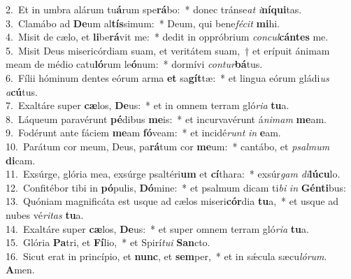 {2.~}Et in umbra alárum tu\textbf{á}rum spe\textbf{rá}bo:~* donec tránse\textit{at} \textit{i}\textbf{ní}\textbf{qui}tas.\\
{3.~}Clamábo ad \textbf{De}um al\textbf{tís}simum:~* Deum, qui bene\textit{fé}\textit{cit} \textbf{mi}hi.\\
{4.~}Misit de cælo, et \textbf{li}be\textbf{rá}vit me:~* dedit in oppróbrium \textit{con}\textit{cul}\textbf{cán}\textbf{tes} me.\\
{5.~}Misit Deus misericórdiam suam, et veritátem suam,~† et erípuit ánimam meam de médio catu\textbf{ló}rum le\textbf{ó}num:~* dormívi \textit{con}\textit{tur}\textbf{bá}tus.\\
{6.~}Fílii hóminum dentes eórum arma \textbf{et} sa\textbf{gít}tæ:~* et lingua eórum gládi\textit{us} \textit{a}\textbf{cú}tus.\\
{7.~}Exaltáre super \textbf{cæ}los, \textbf{De}us:~* et in omnem terram gló\textit{ri}\textit{a} \textbf{tu}a.\\
{8.~}Láqueum paravérunt \textbf{pé}dibus \textbf{me}is:~* et incurvavérunt á\textit{ni}\textit{mam} \textbf{me}am.\\
{9.~}Fodérunt ante fáciem \textbf{me}am \textbf{fó}veam:~* et incidé\textit{runt} \textit{in} \textbf{e}am.\\
{10.~}Parátum cor meum, Deus, pa\textbf{rá}tum cor \textbf{me}um:~* cantábo, et \textit{psal}\textit{mum} \textbf{di}cam.\\
{11.~}Exsúrge, glória mea, exsúrge psaltéri\textbf{um} et \textbf{cí}thara:~* exsúr\textit{gam} \textit{di}\textbf{lú}\textbf{cu}lo.\\
{12.~}Confitébor tibi in \textbf{pó}pulis, \textbf{Dó}mine:~* et psalmum dicam ti\textit{bi} \textit{in} \textbf{Gén}\textbf{ti}bus:\\
{13.~}Quóniam magnificáta est usque ad cælos miseri\textbf{cór}dia \textbf{tu}a,~* et usque ad nubes vé\textit{ri}\textit{tas} \textbf{tu}a.\\
{14.~}Exaltáre super \textbf{cæ}los, \textbf{De}us:~* et super omnem terram gló\textit{ri}\textit{a} \textbf{tu}a.\\
{15.~}Glória \textbf{Pa}tri, et \textbf{Fí}lio,~* et Spirí\textit{tu}\textit{i} \textbf{San}cto.\\
{16.~}Sicut erat in princípio, et \textbf{nunc}, et \textbf{sem}per,~* et in sǽcula sæcu\textit{ló}\textit{rum}. \textbf{A}men.\\
